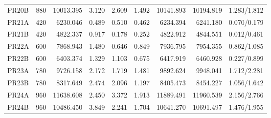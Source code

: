 \begin{tabular}{lrrrrrrrr}
PR20B & 880 & 10013.395 & 3.120 & 2.609 & 1.492 & 10141.893 & 10194.819 & 1.283/1.812 \\
PR21A & 420 & 6230.046 & 0.489 & 0.510 & 0.462 & 6234.394 & 6241.180 & 0.070/0.179 \\
PR21B & 420 & 4822.337 & 0.917 & 0.178 & 0.252 & 4822.912 & 4844.551 & 0.012/0.461 \\
PR22A & 600 & 7868.943 & 1.480 & 0.646 & 0.849 & 7936.795 & 7954.355 & 0.862/1.085 \\
PR22B & 600 & 6403.374 & 1.329 & 1.103 & 0.675 & 6417.919 & 6460.928 & 0.227/0.899 \\
PR23A & 780 & 9726.158 & 2.172 & 1.719 & 1.481 & 9892.624 & 9948.041 & 1.712/2.281 \\
PR23B & 780 & 8317.649 & 2.474 & 2.096 & 1.197 & 8405.473 & 8454.227 & 1.056/1.642 \\
PR24A & 960 & 11638.608 & 2.450 & 3.372 & 1.913 & 11889.491 & 11960.539 & 2.156/2.766 \\
PR24B & 960 & 10486.450 & 3.849 & 2.241 & 1.704 & 10641.270 & 10691.497 & 1.476/1.955 \\
\bottomrule
\end{tabular}
